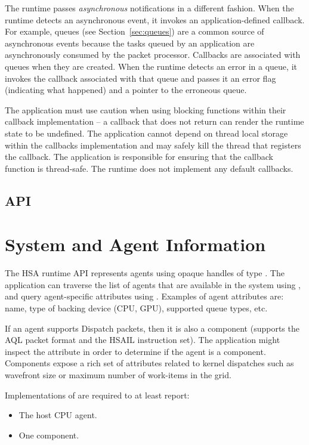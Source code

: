 \documentclass[final]{book}
\begin{document}
The runtime passes \textit{asynchronous} notifications in a different
fashion. When the runtime detects an asynchronous event, it invokes an
application-defined callback. For example, queues (see Section~\ref{sec:queues})
are a common source of asynchronous events because the tasks queued by an
application are asynchronously consumed by the packet processor. Callbacks are
associated with queues when they are created. When the runtime detects an error
in a queue, it invokes the callback associated with that queue and passes it an
error flag (indicating what happened) and a pointer to the erroneous queue.

The application must use caution when using blocking functions within their
callback implementation -- a callback that does not return can render the
runtime state to be undefined. The application cannot depend on thread local
storage within the callbacks implementation and may safely kill the thread that
registers the callback. The application is responsible for ensuring that
the callback function is thread-safe. The runtime does not implement any default
callbacks.

\subsection{API}


\section{System and Agent Information}
\label{sec:agentinfo}

The HSA runtime API represents agents using opaque handles of type
. The application can traverse the list of agents that are
available in the system using , and query
agent-specific attributes using . Examples of agent
attributes are: name, type of backing device (CPU, GPU), supported queue types,
etc.

If an agent supports Dispatch packets, then it is also a component (supports the
AQL packet format and the HSAIL instruction set). The application might inspect
the  attribute in order to determine if the agent
is a component. Components expose a rich set of attributes related to kernel
dispatches such as wavefront size or maximum number of work-items in the grid.

Implementations of  are required to at least report:
\begin{itemize}[itemsep=1pt,topsep=3pt,partopsep=0pt]
\item The host CPU agent.
\item One component.
\end{itemize}
\end{document}
